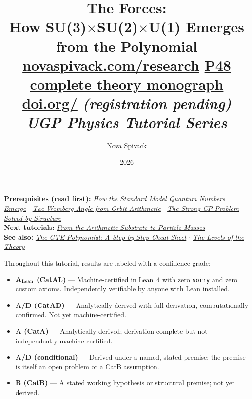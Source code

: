 \documentclass[11pt,a4paper]{article}
\date{2026}
\title{\textbf{The Forces:}\\[6pt]
\large How SU(3)$\times$SU(2)$\times$U(1) Emerges from the Polynomial\\[8pt]
\normalsize
\href{https://novaspivack.com/research}{novaspivack.com/research}\quad
\href{https://doi.org/10.5281/zenodo.20560550}{P48 complete theory monograph}\\[4pt]
\small\href{https://doi.org/\TutorialDOI}{doi.org/\TutorialDOI}
  \textit{(registration pending)}\\[4pt]
\normalsize\textit{UGP Physics Tutorial Series}}
\author{Nova Spivack}
\begin{document}
\setcounter{tocdepth}{2}
\maketitle
\tableofcontents
\newpage

\begin{tcolorbox}[colback=blue!6,colframe=blue!40!black,
  title=\textbf{UGP Physics Tutorial Series}]
\textbf{Prerequisites (read first):}
  \href{https://doi.org/10.5281/zenodo.20657898}{\emph{How the Standard Model Quantum Numbers Emerge}}
  $\cdot$
  \href{https://doi.org/10.5281/zenodo.20657923}{\emph{The Weinberg Angle from Orbit Arithmetic}}
  $\cdot$
  \href{https://doi.org/10.5281/zenodo.20657902}{\emph{The Strong CP Problem Solved by Structure}}\\[4pt]
\textbf{Next tutorials:}
  \href{https://doi.org/10.5281/zenodo.20657913}{\emph{From the Arithmetic Substrate to Particle Masses}}\\[4pt]
\textbf{See also:}
  \href{https://doi.org/10.5281/zenodo.20657889}{\emph{The GTE Polynomial: A Step-by-Step Cheat Sheet}}
  $\cdot$
  \href{https://doi.org/10.5281/zenodo.20657872}{\emph{The Levels of the Theory}}
\end{tcolorbox}

\begin{tcolorbox}[colback=boxgreen,colframe=green!50!black,
  title=\textbf{Claim-Strength Taxonomy}]
Throughout this tutorial, results are labeled with a confidence grade:
\begin{itemize}[itemsep=2pt]
  \item \textbf{$\mathbf{A}_{\rm Lean}$ (CatAL)} --- Machine-certified in Lean~4 with zero \texttt{sorry} and zero custom axioms.  Independently verifiable by anyone with Lean installed.
  \item \textbf{A/D (CatAD)} --- Analytically derived with full derivation, computationally confirmed.  Not yet machine-certified.
  \item \textbf{A (CatA)} --- Analytically derived; derivation complete but not independently machine-certified.
  \item \textbf{A/D (conditional)} --- Derived under a named, stated premise; the premise is itself an open problem or a CatB assumption.
  \item \textbf{B (CatB)} --- A stated working hypothesis or structural premise; not yet derived.
\end{itemize}
\end{tcolorbox}
\end{document}
